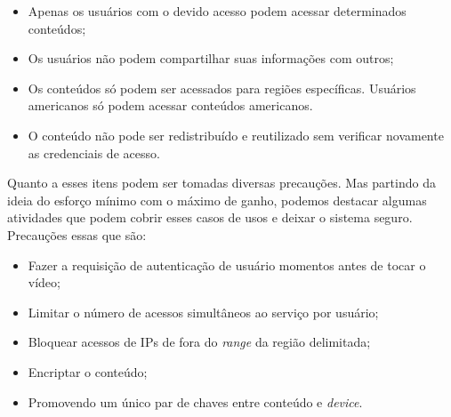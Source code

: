 \begin{itemize}
\item Apenas os usu\'arios com o devido acesso podem acessar determinados conte\'udos;
\item Os usu\'arios n\~ao podem compartilhar suas informa\c{c}\~oes com outros;
\item Os conte\'udos s\'o podem ser acessados para regi\~oes espec\'ificas. Usu\'arios americanos s\'o podem acessar conte\'udos americanos.
\item O conte\'udo n\~ao pode ser redistribu\'ido e reutilizado sem verificar novamente as credenciais de acesso.	 
\end{itemize}

Quanto a esses itens podem ser tomadas diversas precau\c{c}\~oes. Mas partindo da ideia do esforço m\'inimo com o m\'aximo de ganho, podemos destacar algumas atividades que podem cobrir esses casos de usos e deixar o sistema seguro. Precau\c{c}\~oes essas que s\~ao:
\begin{itemize}
\item Fazer a requisi\c{c}\~ao de autentica\c{c}\~ao de usu\'ario momentos antes de tocar o v\'ideo;
\item Limitar o n\'umero de acessos simult\^aneos ao servi\c{c}o por usu\'ario;
\item Bloquear acessos de IPs de fora do \textit{range} da regi\~ao delimitada;
\item Encriptar o conte\'udo;
\item Promovendo um \'unico par de chaves entre conte\'udo e \textit{device}.
\end{itemize}

